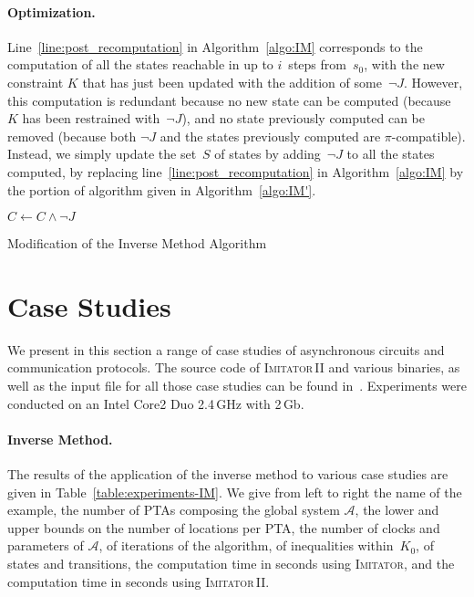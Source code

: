 \documentclass[submission,copyright,creativecommons]{eptcs}
\newcommand{\A}{\mathcal{A}}
\newcommand{\imitator}{\textsc{Imitator}}
\newcommand{\imitatordeux}{\textsc{Imitator}\,II}
\newcommand{\paragraphe}[1]{\paragraph{#1.}}
\begin{document}
\paragraphe{Optimization} \label{ss:optimizations}
Line~\ref{line:post_recomputation} in Algorithm~\ref{algo:IM} corresponds to the computation of all the states reachable in up to $i$~steps from~$s_0$, with the new constraint $K$ that has just been updated with the addition of some~$\neg J$.
However, this computation is redundant because no new state can be computed (because~$K$ has been restrained with~$\neg J$), and no state previously computed can be removed (because both $\neg J$ and the states previously computed are $\pi$-compatible).
Instead, we simply update the set~$S$ of states by adding~$\neg J$ to all the states computed, by replacing line~\ref{line:post_recomputation} in Algorithm~\ref{algo:IM} by the portion of algorithm given in Algorithm~\ref{algo:IM'}.

\IncMargin{1em}
\begin{algorithm}[ht!]

{
	$C \leftarrow C \land \neg J$
}

\caption{Modification of the Inverse Method Algorithm}\label{algo:IM'}
\end{algorithm}\DecMargin{1em}









\section{Case Studies} \label{sec:experiments}


We present in this section a range of case studies of asynchronous circuits and communication protocols.
The source code of \imitatordeux{} and various binaries, as well as the input file for all those case studies can be found in~\cite{imitator2_web}.
Experiments were conducted on an Intel Core2 Duo 2.4\,GHz with 2\,Gb.



\paragraphe{Inverse Method}
The results of the application of the inverse method to various case studies are given in Table~\ref{table:experiments-IM}.
We give from left to right the name of the example, the number of PTAs composing the global system $\A$,
the lower and upper bounds on the number of locations per PTA,
the number of clocks and parameters of $\A$,
of iterations of the algorithm,
of inequalities within~$K_0$,
of states and transitions,
the computation time in seconds using \imitator{},
and the computation time in seconds using \imitatordeux{}. 
\end{document}
